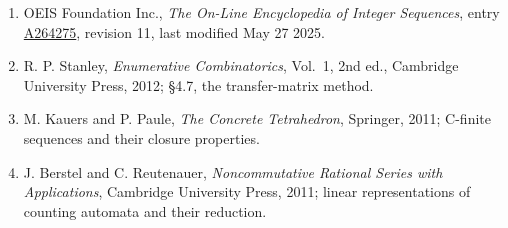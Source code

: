 \documentclass[11pt]{article}
\theoremstyle{definition}
\begin{document}
\begin{enumerate}

\item OEIS Foundation Inc., \emph{The On-Line Encyclopedia of Integer Sequences}, entry \href{https://oeis.org/A264275}{A264275}, revision 11, last modified May 27 2025.

\item R. P. Stanley, \emph{Enumerative Combinatorics}, Vol.~1, 2nd ed., Cambridge University Press, 2012; \S4.7, the transfer-matrix method.

\item M. Kauers and P. Paule, \emph{The Concrete Tetrahedron}, Springer, 2011; C-finite sequences and their closure properties.

\item J. Berstel and C. Reutenauer, \emph{Noncommutative Rational Series with Applications}, Cambridge University Press, 2011; linear representations of counting automata and their reduction.

\end{enumerate}
\end{document}
